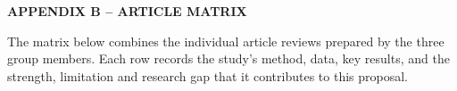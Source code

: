 \documentclass[12pt,a4paper]{article}
\begin{document}
\newpage

{}

\begin{flushleft}
    {\fontsize{14pt}{17pt}\selectfont
    \textbf{APPENDIX B -- ARTICLE MATRIX}}
\end{flushleft}

\vspace{0.5cm}

The matrix below combines the individual article reviews prepared by the three group members. Each
row records the study's method, data, key results, and the strength, limitation and research gap
that it contributes to this proposal.


\vspace{0.5cm}








\fontsize{7pt}{8.5pt}\selectfont
\setlength{\tabcolsep}{1pt}
\renewcommand{\arraystretch}{1.15}
\setlength\LTleft{0pt}
\setlength\LTright{\fill}
\end{document}
